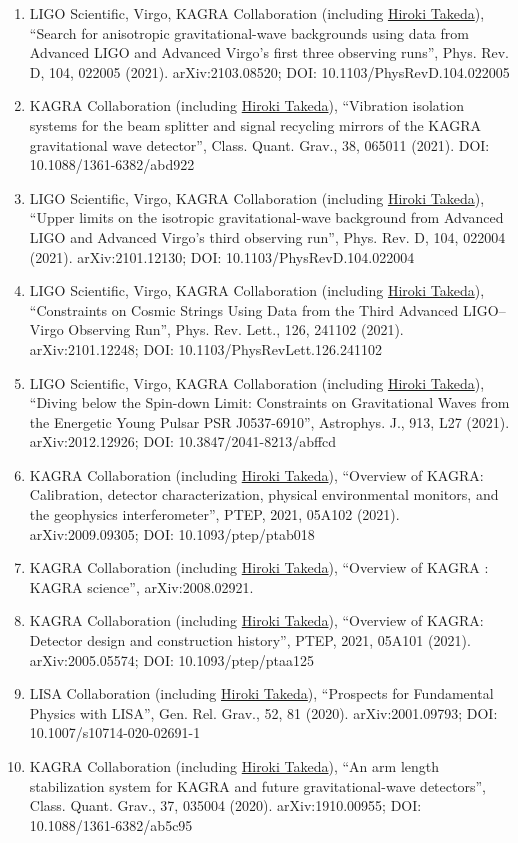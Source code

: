 \documentclass[uplatex, 11pt]{jsarticle}
\begin{document}
\begin{enumerate}
\item LIGO Scientific, Virgo, KAGRA Collaboration (including \uline{Hiroki Takeda}), “Search for anisotropic gravitational-wave backgrounds using data from Advanced LIGO and Advanced Virgo's first three observing runs”, Phys. Rev. D, 104, 022005 (2021). arXiv:2103.08520; DOI: 10.1103/PhysRevD.104.022005
\item KAGRA Collaboration (including \uline{Hiroki Takeda}), “Vibration isolation systems for the beam splitter and signal recycling mirrors of the KAGRA gravitational wave detector”, Class. Quant. Grav., 38, 065011 (2021). DOI: 10.1088/1361-6382/abd922
\item LIGO Scientific, Virgo, KAGRA Collaboration (including \uline{Hiroki Takeda}), “Upper limits on the isotropic gravitational-wave background from Advanced LIGO and Advanced Virgo's third observing run”, Phys. Rev. D, 104, 022004 (2021). arXiv:2101.12130; DOI: 10.1103/PhysRevD.104.022004
\item LIGO Scientific, Virgo, KAGRA Collaboration (including \uline{Hiroki Takeda}), “Constraints on Cosmic Strings Using Data from the Third Advanced LIGO–Virgo Observing Run”, Phys. Rev. Lett., 126, 241102 (2021). arXiv:2101.12248; DOI: 10.1103/PhysRevLett.126.241102
\item LIGO Scientific, Virgo, KAGRA Collaboration (including \uline{Hiroki Takeda}), “Diving below the Spin-down Limit: Constraints on Gravitational Waves from the
Energetic Young Pulsar PSR J0537-6910”, Astrophys. J., 913, L27 (2021). arXiv:2012.12926; DOI: 10.3847/2041-8213/abffcd
\item KAGRA Collaboration (including \uline{Hiroki Takeda}), “Overview of KAGRA: Calibration, detector characterization, physical environmental monitors, and the geophysics interferometer”, PTEP, 2021, 05A102 (2021). arXiv:2009.09305; DOI: 10.1093/ptep/ptab018
\item KAGRA Collaboration (including \uline{Hiroki Takeda}), “Overview of KAGRA : KAGRA science”, arXiv:2008.02921.
\item KAGRA Collaboration (including \uline{Hiroki Takeda}), “Overview of KAGRA: Detector design and construction history”, PTEP, 2021, 05A101 (2021). arXiv:2005.05574; DOI: 10.1093/ptep/ptaa125
\item LISA Collaboration (including \uline{Hiroki Takeda}), “Prospects for Fundamental Physics with LISA”, Gen. Rel. Grav., 52, 81 (2020). arXiv:2001.09793; DOI: 10.1007/s10714-020-02691-1
\item KAGRA Collaboration (including \uline{Hiroki Takeda}), “An arm length stabilization system for KAGRA and future gravitational-wave detectors”, Class. Quant. Grav., 37, 035004 (2020). arXiv:1910.00955; DOI: 10.1088/1361-6382/ab5c95

\end{enumerate}
\end{document}
